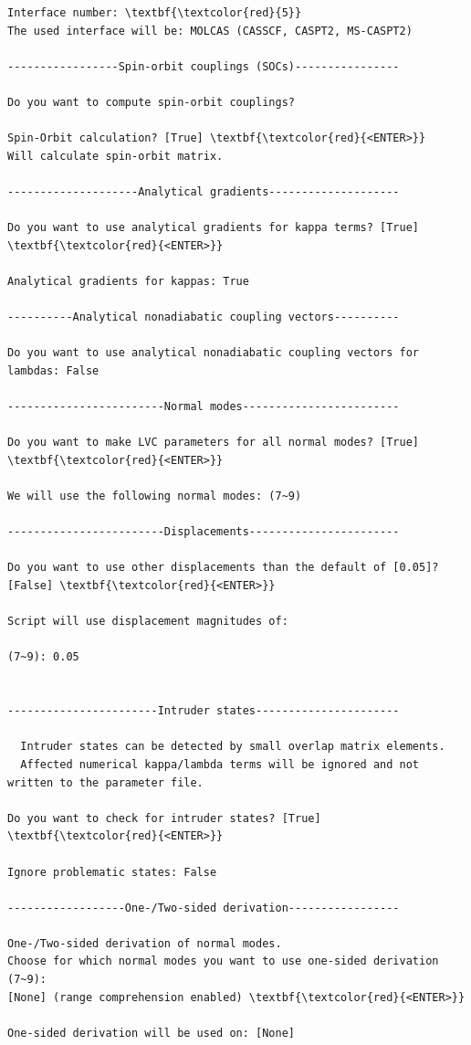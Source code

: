 \documentclass[a4paper,11pt,DIV=15,openany]{scrbook}
\begin{document}
\begin{oframed}
\begin{Verbatim}[commandchars=\\\{\}]
Interface number: \textbf{\textcolor{red}{5}}
The used interface will be: MOLCAS (CASSCF, CASPT2, MS-CASPT2)

-----------------Spin-orbit couplings (SOCs)----------------

Do you want to compute spin-orbit couplings?

Spin-Orbit calculation? [True] \textbf{\textcolor{red}{<ENTER>}}
Will calculate spin-orbit matrix.

--------------------Analytical gradients--------------------

Do you want to use analytical gradients for kappa terms? [True] \textbf{\textcolor{red}{<ENTER>}}

Analytical gradients for kappas: True

----------Analytical nonadiabatic coupling vectors----------

Do you want to use analytical nonadiabatic coupling vectors for lambdas: False

------------------------Normal modes------------------------

Do you want to make LVC parameters for all normal modes? [True] \textbf{\textcolor{red}{<ENTER>}}

We will use the following normal modes: (7~9)

------------------------Displacements-----------------------

Do you want to use other displacements than the default of [0.05]? [False] \textbf{\textcolor{red}{<ENTER>}}

Script will use displacement magnitudes of:

(7~9): 0.05
 

-----------------------Intruder states----------------------

  Intruder states can be detected by small overlap matrix elements.
  Affected numerical kappa/lambda terms will be ignored and not written to the parameter file.

Do you want to check for intruder states? [True] \textbf{\textcolor{red}{<ENTER>}}

Ignore problematic states: False

------------------One-/Two-sided derivation-----------------

One-/Two-sided derivation of normal modes.
Choose for which normal modes you want to use one-sided derivation (7~9): 
[None] (range comprehension enabled) \textbf{\textcolor{red}{<ENTER>}}

One-sided derivation will be used on: [None]



\end{Verbatim}
\end{oframed}
\end{document}
